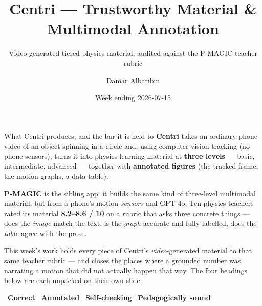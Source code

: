 \documentclass[aspectratio=169,10pt]{beamer}
\title{Centri --- Trustworthy Material \& Multimodal Annotation}
\subtitle{Video-generated tiered physics material, audited against the P-MAGIC teacher rubric}
\author{Damar Albaribin}
\institute{MSc Thesis --- advisor: Prof.\ Wu-Yuin Hwang}
\date{Week ending 2026-07-15}
\newcommand{\ok}{{\color{cApp}\textbf{\checkmark}}}
\begin{document}
\maketitle

\begin{frame}{What Centri produces, and the bar it is held to}
\small
\textbf{Centri} takes an ordinary phone video of an object spinning in a circle and, using
computer-vision tracking (no phone sensors), turns it into physics learning material at
\textbf{three levels} --- basic, intermediate, advanced --- together with \textbf{annotated figures}
(the tracked frame, the motion graphs, a data table).
\vspace{0.5em}

\textbf{P-MAGIC} is the sibling app: it builds the same kind of three-level multimodal material, but
from a phone's motion \emph{sensors} and GPT-4o. Ten physics teachers rated its material
\textbf{8.2--8.6 / 10} on a rubric that asks three concrete things --- does the \emph{image} match the
text, is the \emph{graph} accurate and fully labelled, does the \emph{table} agree with the prose.
\vspace{0.5em}

\begin{tcolorbox}[colback=cMeas!6,colframe=cMeas,boxsep=2pt,left=6pt,right=6pt,top=3pt,bottom=3pt]
\small This week's work holds every piece of Centri's \emph{video}-generated material to that same
teacher rubric --- and closes the places where a grounded number was narrating a motion that did not
actually happen that way. The four headings below are each unpacked on their own slide.
\end{tcolorbox}
\vspace{0.4em}
{\small \ok\ \textbf{\color{cMeas}Correct} \quad \ok\ \textbf{\color{cPed}Annotated} \quad
\ok\ \textbf{\color{cInfra}Self-checking} \quad \ok\ \textbf{\color{cApp}Pedagogically sound}}
\end{frame}
\end{document}
